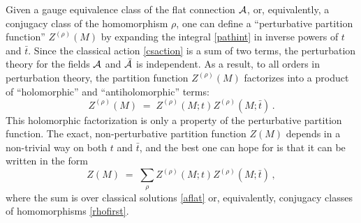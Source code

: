 \documentclass[hyper]{JHEP3}
\def\CA {{\cal A}}
\newcommand\be{\begin{equation}}
\newcommand\ee{\end{equation}}
\def\={\;=\;}
\begin{document}
Given a gauge equivalence class of the flat connection $\CA$, or, equivalently,
a conjugacy class of the homomorphism $\rho$,
one can define a ``perturbative partition function'' $Z^{(\rho)} (M)$
by expanding the integral \eqref{pathint} in inverse powers of $t$ and $\bar t$.
Since the classical action \eqref{csaction} is a sum of two terms,
the perturbation theory for the fields $\CA$ and $\bar \CA$ is independent.
As a result, to all orders in perturbation theory, the partition
function $Z^{(\rho)} (M)$ factorizes into a product of ``holomorphic''
and ``antiholomorphic'' terms:
\be
Z^{(\rho)} (M) \= Z^{(\rho)} (M;t) Z^{(\rho)} (M;\bar t)\,.
\label{zfactorization}
\ee
This holomorphic factorization is only a property of
the perturbative partition function.
The exact, non-perturbative partition function $Z(M)$
depends in a non-trivial way on both $t$ and $\bar t$,
and the best one can hope for is that it can be written in the form
\be
Z(M) \= \sum_{\rho} Z^{(\rho)} (M;t) Z^{(\rho)} (M;\bar t)\,,
\ee
where the sum is over classical solutions  \eqref{aflat} or,
equivalently, conjugacy classes of homomorphisms \eqref{rhofirst}.
\end{document}
